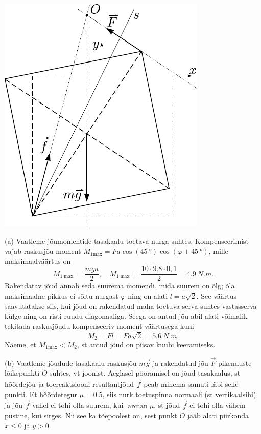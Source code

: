 \documentclass[11pt, twoside]{article}
\begin{document}
{{\begin{center}
	\includegraphics[height=0.6\textheight]{2007-v2g-09-lah}
\end{center}

(a) Vaatleme jõumomentide tasakaalu toetava nurga suhtes. Kompenseerimist vajab raskusjõu moment $M_{1 \mathrm{max}} = F a \cos (\SI{45}{\degree}) \cos (\varphi + \SI{45}{\degree})$, mille maksimaalväärtus on 
\[
M_{1 \max }=\frac{m g a}{2}, \quad M_{1 \max }=\frac{10 \cdot \num{9,8} \cdot 0,1}{2}=\SI{4,9}{N.m}.
\]
Rakendatav jõud annab seda suurema momendi, mida suurem on õlg; õla maksimaalne pikkus ei sõltu nurgast $\varphi$ ning on alati $l = a \sqrt 2$. See väärtus saavutatakse siis, kui jõud on rakendatud maha toetuva serva suhtes vastasserva külge ning on risti ruudu diagonaaliga. Seega on antud jõu abil alati võimalik tekitada raskusjõudu kompenseeriv moment väärtusega kuni
\[
M_{2}=F l=F a \sqrt{2} = \SI{5.6}{N.m}.
\]
Näeme, et $M_{1 \mathrm{max}} < M_2$, st antud jõud on piisav kuubi keeramiseks.


(b) Vaatleme jõudude tasakaalu raskusjõu $m\vec g$ ja rakendatud jõu $\vec F$ pikenduste lõikepunkti $O$ suhtes, vt joonist. Aeglasel pööramisel on jõud tasakaalus, st hõõrdejõu ja toereaktsiooni resultantjõud $\vec f$ peab minema samuti läbi selle punkti. Et hõõrdetegur $\mu = \num{0,5}$, siis nurk toetuspinna normaali (st vertikaalsihi) ja jõu $\vec f$ vahel ei tohi olla suurem, kui $\arctan \mu$, st jõud $\vec f$ ei tohi olla vähem püstine, kui sirges. Nii see ka tõepoolest on, sest punkt $O$ jääb alati piirkonda $x \leq 0$ ja $y > 0$. 

}}
\end{document}
